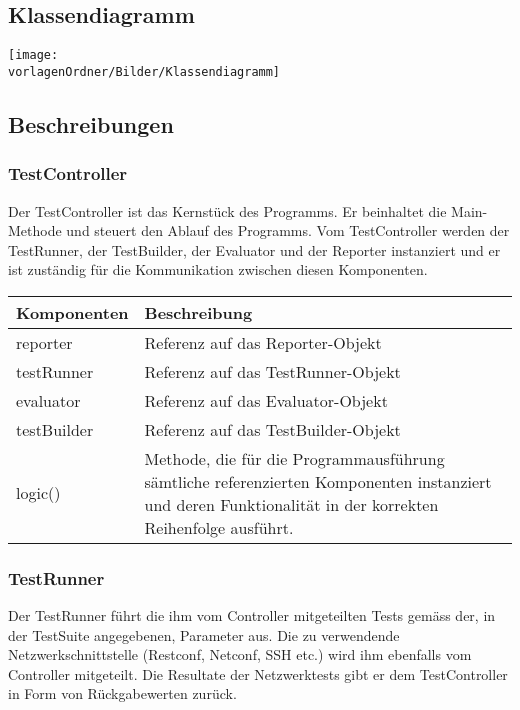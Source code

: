 \documentclass[
	ngerman,
	toc=listof, %
	toc=bibliography, %
	footnotes=multiple, %
	parskip=half, %
	numbers=noendperiod %
]{scrartcl}
\newcommand{\vorlagenOrdner}{../../99_Vorlagen} %
\begin{document}
\begin{landscape}
	\section{Klassendiagramm}
	\texttt{[image: \\vorlagenOrdner/Bilder/Klassendiagramm]}
	\newpage	
\end{landscape}


	\subsection{Beschreibungen}

	\subsubsection{TestController}
	Der TestController ist das Kernstück des Programms. 
	Er beinhaltet die Main-Methode und steuert den Ablauf des Programms. 
	Vom TestController werden der TestRunner, der TestBuilder, der Evaluator und der Reporter instanziert und er ist zuständig für die Kommunikation zwischen diesen Komponenten.
	
	\begin{tabularx}{\textwidth}{lX}
		\toprule
			Komponenten & Beschreibung \\
		\midrule
			reporter & Referenz auf das Reporter-Objekt \\
			testRunner & Referenz auf das TestRunner-Objekt \\
			evaluator & Referenz auf das Evaluator-Objekt \\
			testBuilder & Referenz auf das TestBuilder-Objekt \\
		\midrule
			logic() & Methode, die für die Programmausführung sämtliche referenzierten Komponenten instanziert und deren Funktionalität in der korrekten Reihenfolge ausführt.\\
		\bottomrule
	\end{tabularx}

	\subsubsection{TestRunner}
	Der TestRunner führt die ihm vom Controller mitgeteilten Tests gemäss der, in der TestSuite angegebenen, Parameter aus. 
	Die zu verwendende Netzwerkschnittstelle (Restconf, Netconf, SSH etc.) wird ihm ebenfalls vom Controller mitgeteilt.
	Die Resultate der Netzwerktests gibt er dem TestController in Form von Rückgabewerten zurück.
\end{document}
